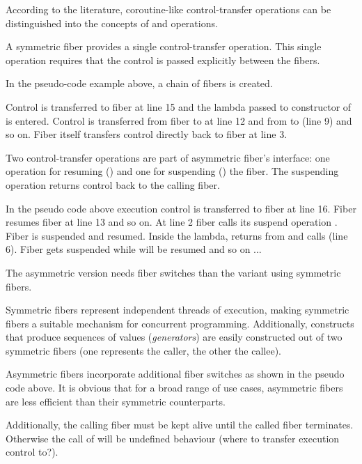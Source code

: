
According to the literature\cite{Moura2009}, coroutine-like control-transfer
operations can be distinguished into the concepts of \sym and \asym
operations.

 A symmetric fiber provides a single
control-transfer operation. This single operation requires that the control is
passed explicitly between the fibers.


In the pseudo-code example above, a chain of fibers is created.

Control is transferred to fiber  at line 15 and the lambda
passed to constructor of  is entered. Control is transferred from
fiber  to  at line 12 and from  to  (line 9) and
so on. Fiber  itself transfers control directly back to
fiber  at line 3.

 Two control-transfer operations are part of
asymmetric fiber's interface: one operation for resuming (\resume) and one for
suspending () the fiber. The suspending operation returns
control back to the calling fiber.

In the pseudo code above execution control is transferred to fiber  at
line 16. Fiber  resumes fiber  at line 13 and so on. At line 2
fiber  calls its suspend operation . Fiber 
is suspended and  resumed. Inside the lambda,  returns from
 and calls  (line 6). Fiber  gets
suspended while  will be resumed and so on ...

The asymmetric version needs  fiber switches than the variant
using symmetric fibers.


Symmetric fibers represent independent threads of execution, making symmetric
fibers a suitable mechanism for concurrent programming. Additionally,
constructs that produce sequences of values (\emph{generators}) are easily
constructed out of two symmetric fibers (one represents the caller, the other
the callee).

Asymmetric fibers incorporate additional fiber switches as shown in the pseudo
code above. It is obvious that for a broad range of use cases, asymmetric
fibers are less efficient than their symmetric counterparts.

Additionally, the calling fiber must be kept alive until the called fiber
terminates. Otherwise the call of  will be undefined behaviour
(where to transfer execution control to?).

